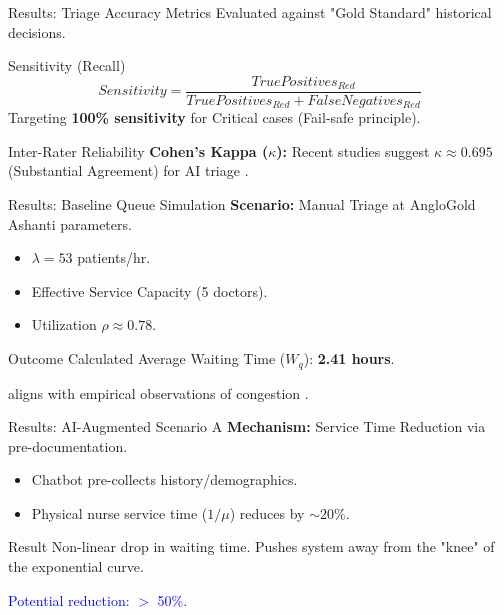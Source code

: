 \documentclass[aspectratio=169,12pt]{beamer}
\newcommand{\bcol}[2][blue]{\textcolor{#1}{#2}}
\begin{document}
	\begin{frame}{Results: Triage Accuracy Metrics}
		Evaluated against "Gold Standard" historical decisions.
		
		\begin{block}{Sensitivity (Recall)}
			\begin{equation*}
				Sensitivity = \frac{TruePositives_{Red}}{TruePositives_{Red} + FalseNegatives_{Red}}
			\end{equation*}
			Targeting \textbf{100\% sensitivity} for Critical cases (Fail-safe principle).
		\end{block}
		
		\begin{block}{Inter-Rater Reliability}
			\textbf{Cohen's Kappa ($\kappa$):} Recent studies suggest $\kappa \approx 0.695$ (Substantial Agreement) for AI triage \citep{Gottlieb2025}.
		\end{block}
	\end{frame}
	
	\begin{frame}{Results: Baseline Queue Simulation}
		\textbf{Scenario:} Manual Triage at AngloGold Ashanti parameters.
		
		\begin{itemize}
			\item $\lambda = 53$ patients/hr.
			\item Effective Service Capacity (5 doctors).
			\item Utilization $\rho \approx 0.78$.
		\end{itemize}
		
		\begin{alertblock}{Outcome}
			Calculated Average Waiting Time ($W_q$): \textbf{2.41 hours}.
			\par aligns with empirical observations of congestion \citep{Afrane2014}.
		\end{alertblock}
	\end{frame}
	
	\begin{frame}{Results: AI-Augmented Scenario A}
		\textbf{Mechanism:} Service Time Reduction via pre-documentation.
		
		\begin{itemize}
			\item Chatbot pre-collects history/demographics.
			\item Physical nurse service time ($1/\mu$) reduces by $\sim 20\%$.
		\end{itemize}
		
		\begin{exampleblock}{Result}
			Non-linear drop in waiting time. Pushes system away from the "knee" of the exponential curve.
			\par \bcol{Potential reduction: $>$ 50\%}.
		\end{exampleblock}
	\end{frame}
	
\end{document}
